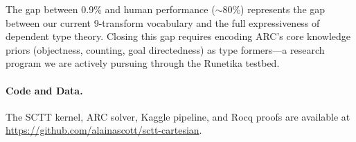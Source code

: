 \documentclass[11pt,a4paper]{article}
\begin{document}
The gap between 0.9\% and human performance ($\sim$80\%) represents
the gap between our current 9-transform vocabulary and the full
expressiveness of dependent type theory.  Closing this gap requires
encoding ARC's core knowledge priors (objectness, counting, goal
directedness) as type formers---a research program we are actively
pursuing through the Runetika testbed.

\paragraph{Code and Data.}
The SCTT kernel, ARC solver, Kaggle pipeline, and Rocq proofs are
available at \url{https://github.com/alainascott/sctt-cartesian}.



\end{document}
